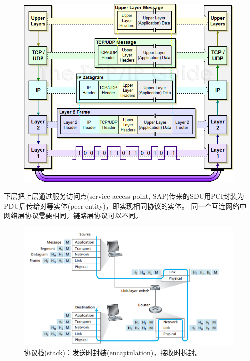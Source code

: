 \begin{minipage}{0.4\linewidth}
\begin{center}
\end{center}
\end{minipage}
\begin{minipage}{0.6\linewidth}
\begin{figure}[H]
	\centering
	\includegraphics[width=\linewidth]{fig/ipencap.png}
\end{figure}
\end{minipage}

\bigskip
下层把上层通过服务访问点(service access point, SAP)传来的SDU用PCI封装为PDU后传给对等实体(peer entity)，即实现相同协议的实体。
同一个互连网络中网络层协议需要相同，链路层协议可以不同。

\myhline
\begin{figure}[H]
	\centering
	\includegraphics[width=0.8\linewidth]{fig/network-flow.PNG}
	\caption*{协议栈(stack)：发送时封装(encaptulation)，接收时拆封。}
\end{figure}

